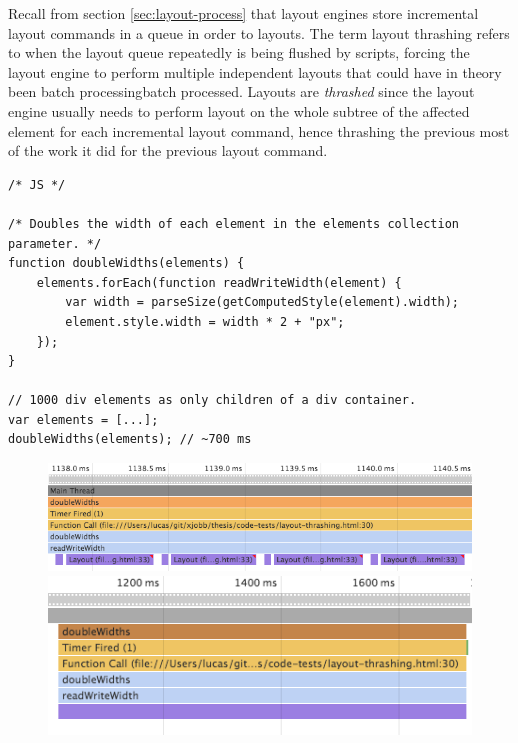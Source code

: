 \documentclass[a4paper,11pt]{kth-mag}
\begin{document}
        Recall from section \ref{sec:layout-process} that \glspl{layout engine} store incremental layout commands in a queue in order to  layouts.
        The term \gls{layout thrashing} refers to when the layout queue repeatedly is being flushed by scripts, forcing the \gls{layout engine} to perform multiple independent layouts that could have in theory been \gls{batch processing}{batch processed}.
        Layouts are \emph{thrashed} since the layout engine usually needs to perform layout on the whole subtree of the affected element for each incremental layout command, hence thrashing the previous most of the work it did for the previous layout command.
        \begin{lstlisting}[caption={Example of layout thrashing. The code reads and double the widths of 1000 elements in \textasciitilde600 ms.}, captionpos=b, label={code:thrashing-example}]
/* JS */

/* Doubles the width of each element in the elements collection parameter. */
function doubleWidths(elements) {
    elements.forEach(function readWriteWidth(element) {
        var width = parseSize(getComputedStyle(element).width);
        element.style.width = width * 2 + "px";
    });
}

// 1000 div elements as only children of a div container.
var elements = [...];
doubleWidths(elements); // ~700 ms
        \end{lstlisting}

        \begin{figure}
          \centering
          \includegraphics[width=\linewidth]{images/layout-thrashing-example-1}
          \includegraphics[width=\linewidth]{images/layout-thrashing-example-1-big}
          \caption{}
          \label{fig:layout-thrashing-example-1}
        \end{figure}
\end{document}
